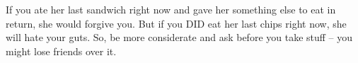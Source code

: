 \ex{}If you ate her last sandwich right now and gave her something else to eat in return, she would forgive you. But if you \MakeUppercase{did} eat her last chips right now, she will hate your guts. So, be more considerate and ask before you take stuff – you might lose friends over it.\xe

